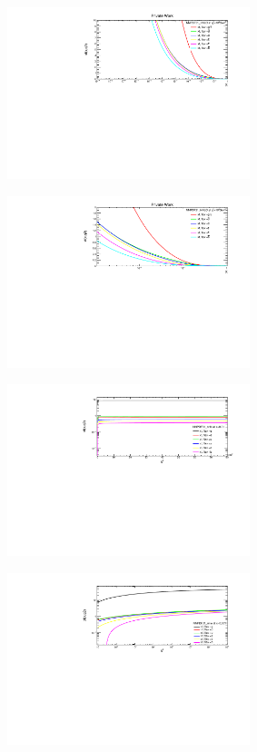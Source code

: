\begin{figure}[H]
\begin{subfigure}{0.45\textwidth}
\vspace*{-8mm}
\caption{}
\end{subfigure}
\begin{subfigure}{0.45\textwidth}
\includegraphics[height=5cm, width=\textwidth]{chapter4/barxfx10000gev.pdf}
\vspace*{-8mm}
\caption{}
\end{subfigure}
\begin{subfigure}{0.45\textwidth}
\includegraphics[height=5cm, width=\textwidth]{chapter4/barxfx10000gev1.pdf}
\vspace*{-8mm}
\caption{}
\end{subfigure}
\begin{subfigure}{0.45\textwidth}
\includegraphics[height=5cm, width=\textwidth]{chapter4/qfxplot0.01.pdf}
\vspace*{-8mm}
\caption{}
\end{subfigure}
\begin{subfigure}{0.45\textwidth}
\includegraphics[height=5cm, width=\textwidth]{chapter4/qfxplot0.001.pdf}

\end{subfigure}
\end{figure}
